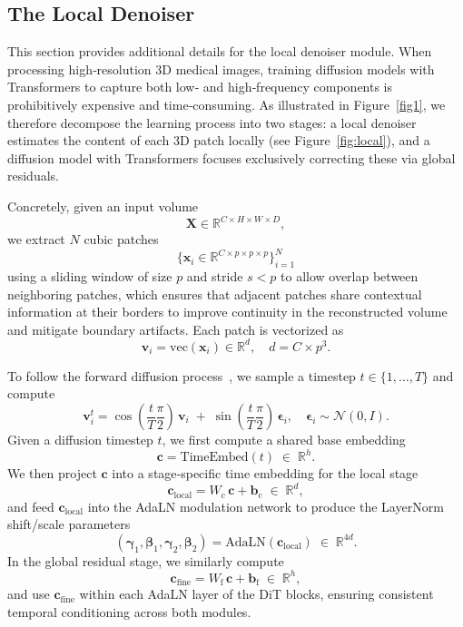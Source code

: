 \subsection{The Local Denoiser}
\label{ap:l}
This section provides additional details for the local denoiser module. When processing high‐resolution 3D medical images, training diffusion models with Transformers to capture both low‐ and high‐frequency components is prohibitively expensive and time‐consuming. As illustrated in Figure~\ref{fig1}, we therefore decompose the learning process into two stages: a local denoiser estimates the content of each 3D patch locally (see Figure~\ref{fig:local}), and a diffusion model with Transformers focuses exclusively correcting these via global residuals. 

Concretely, given an input volume 
\[
  \boldsymbol{X} \in \mathbb{R}^{C\times H\times W\times D},
\]
we extract \(N\) cubic patches 
\[
  \{\boldsymbol{x}_i\in\mathbb{R}^{C\times p\times p\times p}\}_{i=1}^N
\]
using a sliding window of size \(p\) and stride \(s<p\) to allow overlap between neighboring patches, which ensures that adjacent patches share contextual information at their borders to improve continuity in the reconstructed volume and mitigate boundary artifacts. Each patch is vectorized as 
\[
  \boldsymbol{v}_i = \mathrm{vec}(\boldsymbol{x}_i)\in\mathbb{R}^d,\quad d=C \times p^3.
\]

To follow the forward diffusion process~\citep{zhang2023improving}, we sample a timestep \(t\in\{1,\dots,T\}\) and compute
\[
\boldsymbol{v}_i^t = \cos(\frac{t}{T} \frac{\pi}{2})\,\boldsymbol{v}_i \;+\;\sin(\frac{t}{T} \frac{\pi}{2})\,\boldsymbol{\epsilon}_i,\quad
  \boldsymbol{\epsilon}_i\sim\mathcal{N}(0,I).
\]
Given a diffusion timestep \(t\), we first compute a shared base embedding
\[
  \boldsymbol{c} = \mathrm{TimeEmbed}(t)\;\in\;\mathbb{R}^h.
\]
We then project \(\boldsymbol{c}\) into a stage‐specific time embedding for the local stage
\[
  \boldsymbol{c}_{\mathrm{local}}
  = W_{\mathrm{c}}\,\boldsymbol{c} + \boldsymbol{b}_{\mathrm{c}}
  \;\in\;\mathbb{R}^d,
\]
and feed \(\boldsymbol{c}_{\mathrm{local}}\) into the AdaLN modulation network to produce the LayerNorm shift/scale parameters
\[
  (\boldsymbol{\gamma}_1,\boldsymbol{\beta}_1,\boldsymbol{\gamma}_2,\boldsymbol{\beta}_2)
  = \mathrm{AdaLN}(\boldsymbol{c}_{\mathrm{local}})
  \;\in\;\mathbb{R}^{4d}.
\]
In the global residual stage, we similarly compute
\[
  \boldsymbol{c}_{\mathrm{fine}}
  = W_{\mathrm{f}}\,\boldsymbol{c} + \boldsymbol{b}_{\mathrm{f}}
  \;\in\;\mathbb{R}^h,
\]
and use \(\boldsymbol{c}_{\mathrm{fine}}\) within each AdaLN layer of the DiT blocks, ensuring consistent temporal conditioning across both modules. 

